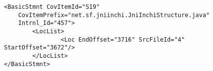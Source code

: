 \begin{lstlisting}
<BasicStmnt CovItemId="S19" 
	CovItemPrefix="net.sf.jniinchi.JniInchiStructure.java"
	Intrnl_Id="457">
		<LocList>
				<Loc EndOffset="3716" SrcFileId="4" StartOffset="3672"/>
		</LocList>
</BasicStmnt>
\end{lstlisting}
